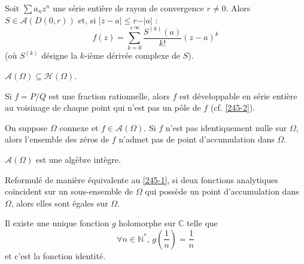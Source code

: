   \begin{proposition}
    Soit $\sum a_n z^n$ une série entière de rayon de convergence $r \neq 0$. Alors $S \in \mathcal{A}(D(0, r))$ et, si $\vert z - a \vert \leq r - \vert a \vert$ :
    \[ f(z) = \sum_{k=0}^{+\infty} \frac{S^{(k)}(a)}{k!} (z-a)^k \]
    (où $S^{(k)}$ désigne la $k$-ième dérivée complexe de $S$).
  \end{proposition}


  \begin{proposition}
    $\mathcal{A}(\Omega) \subseteq \mathcal{H}(\Omega)$.
  \end{proposition}


  \begin{proposition}
    Si $f = P/Q$ est une fraction rationnelle, alors $f$ est développable en série entière au voisinage de chaque point qui n'est pas un pôle de $f$ (cf. \cref{245-2}).
  \end{proposition}


  \begin{theorem}
    \label{245-1}
    On suppose $\Omega$ connexe et $f \in \mathcal{A}(\Omega)$. Si $f$ n'est pas identiquement nulle sur $\Omega$, alors l'ensemble des zéros de $f$ n'admet pas de point d'accumulation dans $\Omega$.
  \end{theorem}


  \begin{corollary}
    $\mathcal{A}(\Omega)$ est une algèbre intègre.
  \end{corollary}


  \begin{remark}
    Reformulé de manière équivalente au \cref{245-1}, si deux fonctions analytiques coïncident sur un sous-ensemble de $\Omega$ qui possède un point d'accumulation dans $\Omega$, alors elles sont égales sur $\Omega$.
  \end{remark}


  \begin{example}
    Il existe une unique fonction $g$ holomorphe sur $\mathbb{C}$ telle que
    \[ \forall n \in \mathbb{N}^*, \, g\left( \frac{1}{n} \right) = \frac{1}{n} \]
    et c'est la fonction identité.
  \end{example}

